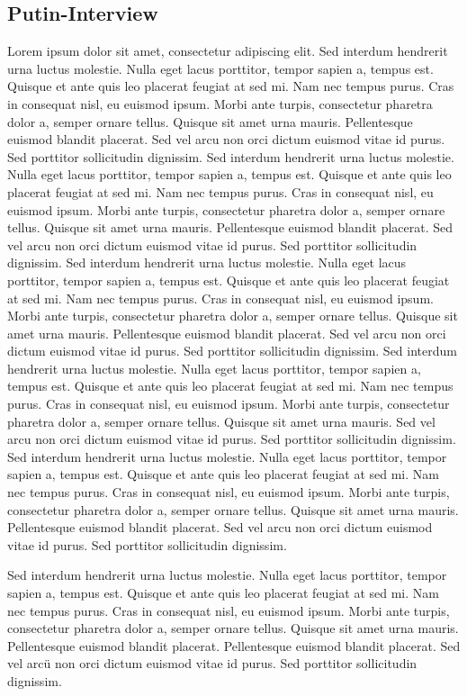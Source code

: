\documentclass{freistuz}
\begin{document}
\begin{multicols}{2}
\subsection{Putin-Interview}
\blindtext
Lorem ipsum dolor sit amet, consectetur adipiscing elit. Sed interdum hendrerit urna luctus molestie. Nulla eget lacus porttitor, tempor sapien a, tempus est. Quisque et ante quis leo placerat feugiat at sed mi. Nam nec tempus purus. Cras in consequat nisl, eu euismod ipsum. Morbi ante turpis, consectetur pharetra dolor a, semper ornare tellus. Quisque sit amet urna mauris. Pellentesque euismod blandit placerat. Sed vel arcu non orci dictum euismod vitae id purus. Sed porttitor sollicitudin dignissim. Sed interdum hendrerit urna luctus molestie. Nulla eget lacus porttitor, tempor sapien a, tempus est. Quisque et ante quis leo placerat feugiat at sed mi. Nam nec tempus purus. Cras in consequat nisl, eu euismod ipsum. Morbi ante turpis, consectetur pharetra dolor a, semper ornare tellus. Quisque sit amet urna mauris. Pellentesque euismod blandit placerat. Sed vel arcu non orci dictum euismod vitae id purus. Sed porttitor sollicitudin dignissim. Sed interdum hendrerit urna luctus molestie. Nulla eget lacus porttitor, tempor sapien a, tempus est. Quisque et ante quis leo placerat feugiat at sed mi. Nam nec tempus purus. Cras in consequat nisl, eu euismod ipsum. Morbi ante turpis, consectetur pharetra dolor a, semper ornare tellus. Quisque sit amet urna mauris. Pellentesque euismod blandit placerat. 
Sed vel arcu non orci dictum euismod vitae id purus. Sed porttitor sollicitudin dignissim. Sed interdum hendrerit urna luctus molestie. Nulla eget lacus porttitor, tempor sapien a, tempus est. Quisque et ante quis leo placerat feugiat at sed mi. Nam nec tempus purus. Cras in consequat nisl, eu euismod ipsum. Morbi ante turpis, consectetur pharetra dolor a, semper ornare tellus. Quisque sit amet urna mauris. Sed vel arcu non orci dictum euismod vitae id purus. Sed porttitor sollicitudin dignissim. Sed interdum hendrerit urna luctus molestie. Nulla eget lacus porttitor, tempor sapien a, tempus est. Quisque et ante quis leo placerat feugiat at sed mi.
Nam nec tempus purus. Cras in consequat nisl, eu euismod ipsum. Morbi ante turpis, consectetur pharetra dolor a, semper ornare tellus. Quisque sit amet urna mauris. Pellentesque euismod blandit placerat. Sed vel arcu non orci dictum euismod vitae id purus. Sed porttitor sollicitudin dignissim. 
\end{multicols}
\begin{multicols}{2}
Sed interdum hendrerit urna luctus molestie. Nulla eget lacus porttitor, tempor sapien a, tempus est. Quisque et ante quis leo placerat feugiat at sed mi. Nam nec tempus purus. Cras in consequat nisl, eu euismod ipsum. Morbi ante turpis, consectetur pharetra dolor a, semper ornare tellus. Quisque sit amet urna mauris. Pellentesque euismod blandit placerat. Pellentesque euismod blandit placerat. Sed vel arcü non orci dictum euismod vitae id purus. Sed porttitor sollicitudin dignissim. 
\end{multicols}
\end{document}
